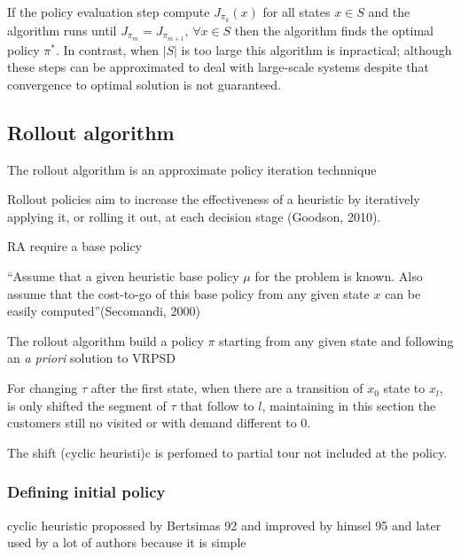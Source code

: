 If the policy evaluation step compute $J_{\pi_k}(x)$ for all states $x \in S$ and the algorithm runs until  $J_{\pi_m} = J_{\pi_{m+1}}$, $\forall x \in S$ then the algorithm finds the optimal policy $\pi^*$. In contrast, when $|S|$ is too large this algorithm is inpractical; although these steps can be approximated to deal with large-scale systems despite that convergence to optimal solution is not guaranteed.


\subsection{Rollout algorithm}

The rollout algorithm is an approximate policy iteration technnique

Rollout policies aim to increase the effectiveness of a heuristic by iteratively applying it, or rolling it out, at each decision stage (Goodson, 2010).

RA require a base policy

``Assume that a given heuristic base policy $\mu$ for the problem is known. Also assume that the cost-to-go of this base policy from any given state $x$ can be easily computed''(Secomandi, 2000)

The rollout algorithm build a policy $\pi$ starting from any given state and following an \textit{a priori} solution to VRPSD

For changing $\tau$ after the first state, when there are a transition of $x_0$ state to $x_l$, is only shifted the segment of $\tau$ that follow to $l$, maintaining in this section the customers still no visited or with demand different to $0$.

The shift (cyclic heuristi)c is perfomed to partial tour not included at the policy.


\subsubsection{Defining initial policy}\label{sec:initial_policy}


cyclic heuristic propossed by Bertsimas 92  and improved by himsel 95 and later used by a lot of authors because it is simple 

